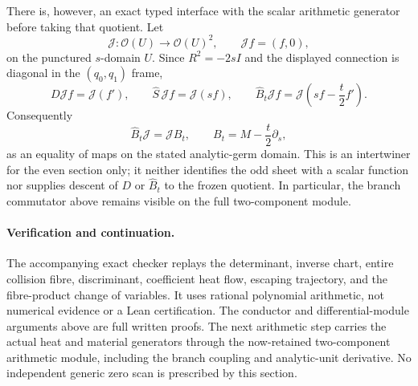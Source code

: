 There is, however, an exact typed interface with the scalar arithmetic
generator before taking that quotient.  Let
\[
 \mathcal J:\mathcal O(U)\longrightarrow\mathcal O(U)^2,
 \qquad \mathcal J f=(f,0),
\]
on the punctured $s$-domain $U$.  Since $R^2=-2sI$ and the displayed
connection is diagonal in the $(q_0,q_1)$ frame,
\[
 D\mathcal Jf=\mathcal J(f'),\qquad
 \widehat S\,\mathcal Jf=\mathcal J(sf),\qquad
 \widehat B_t\mathcal Jf
   =\mathcal J\!\left(sf-\frac t2f'\right).
\]
Consequently
\begin{equation}\label{eq:retained-branch-scalar-intertwiner}
 \widehat B_t\mathcal J=\mathcal J B_t,
 \qquad B_t=M-\frac t2\partial_s,
\end{equation}
as an equality of maps on the stated analytic-germ domain.  This is an
intertwiner for the even section only; it neither identifies the odd sheet
with a scalar function nor supplies descent of $D$ or $\widehat B_t$ to
the frozen quotient.  In particular, the branch commutator above remains
visible on the full two-component module.

\paragraph{Verification and continuation.}
The accompanying exact checker replays the determinant, inverse chart,
entire collision fibre, discriminant, coefficient heat flow, escaping
trajectory, and the fibre-product change of variables. It uses rational
polynomial arithmetic, not numerical evidence or a Lean certification.
The conductor and differential-module arguments above are full written
proofs. The next arithmetic step carries the actual heat and material
generators through the now-retained two-component arithmetic module,
including the branch coupling and analytic-unit derivative. No independent generic zero scan
is prescribed by this section.

